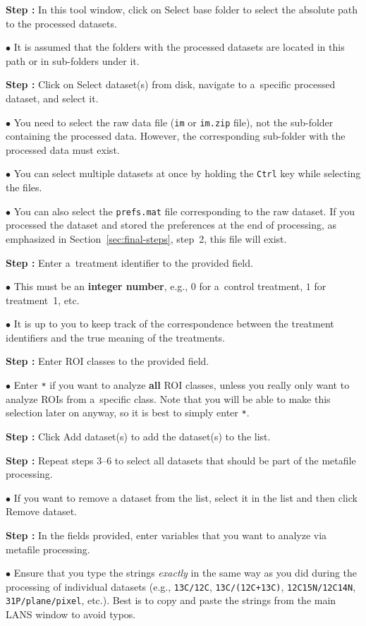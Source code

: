 \documentclass[a4paper, 11pt]{article}
\newcommand{\ttt}[1]{\texttt{#1}}
\newcommand{\lans}[1]{{\color{magenta}#1}}
\newcommand{\lanstf}[1]{{\color{cyan}#1}}
\newcounter{step}
\newcommand\s{\addtocounter{step}{1}\vskip5pt\noindent\textbf{Step \thestep:}{ }}
\newcommand\bul{\vskip5pt\noindent$\bullet${ }}
\newcommand\bb[1]{\textbf{#1}}
\begin{document}
\s In this tool window, click on \lans{Select base folder} to select the absolute path to the processed datasets.

\bul It is assumed that the folders with the processed datasets are located in this path or in sub-folders under it.

\s Click on \lans{Select dataset(s) from disk}, navigate to a~specific processed dataset, and select it.

\bul You need to select the raw data file (\ttt{im} or \ttt{im.zip} file), not the sub-folder containing the processed data. However, the corresponding sub-folder with the processed data must exist.

\bul You can select multiple datasets at once by holding the \ttt{Ctrl} key while selecting the files.

\bul You can also select the \ttt{prefs.mat} file corresponding to the raw dataset. If you processed the dataset and stored the preferences at the end of processing, as emphasized in Section~\ref{sec:final-steps}, step~2, this file will exist.

\s Enter a~\lanstf{treatment identifier} to the provided field.

\bul This must be an \bb{integer number}, e.g., $0$ for a~control treatment, $1$ for treatment~1, etc.

\bul It is up to you to keep track of the correspondence between the treatment identifiers and the true meaning of the treatments.

\s Enter \lanstf{ROI classes} to the provided field.

\bul Enter \ttt{*} if you want to analyze \bb{all} ROI classes, unless you really only want to analyze ROIs from a~specific class. Note that you will be able to make this selection later on anyway, so it is best to simply enter \ttt{*}.

\s Click \lans{Add dataset(s)} to add the dataset(s) to the list. 

\s Repeat steps 3--6 to select all datasets that should be part of the metafile processing.

\bul If you want to remove a dataset from the list, select it in the list and then click \lans{Remove dataset}.

\s In the fields provided, enter \lanstf{variables} that you want to analyze via metafile processing. 

\bul Ensure that you type the strings \emph{exactly} in the same way as you did during the processing of individual datasets (e.g., \ttt{13C/12C}, \ttt{13C/(12C+13C)}, \ttt{12C15N/12C14N}, \ttt{31P/plane/pixel}, etc.). Best is to copy and paste the strings from the main LANS window to avoid typos.
\end{document}
